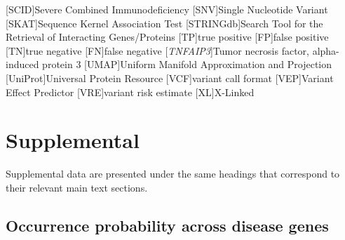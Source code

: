 \begin{acronym}
 [SCID]{Severe Combined Immunodeficiency}
 [SNV]{Single Nucleotide Variant}
 [SKAT]{Sequence Kernel Association Test}
 [STRINGdb]{Search Tool for the Retrieval of Interacting Genes/Proteins}
 [TP]{true positive}
[FP]{false positive}
[TN]{true negative}
[FN]{false negative}
[\textit{TNFAIP3}]{Tumor necrosis factor, alpha-induced protein 3}
 [UMAP]{Uniform Manifold Approximation and Projection}
 [UniProt]{Universal Protein Resource} 
 [VCF]{variant call format}
 [VEP]{Variant Effect Predictor}
 [VRE]{variant risk estimate}
 [XL]{X-Linked}
\end{acronym}

\beginsupplement
\section{Supplemental} \label{Supplemental_text}

Supplemental data are presented under the same headings that correspond to their relevant main text sections. 

\subsection{Occurrence probability across disease genes}

